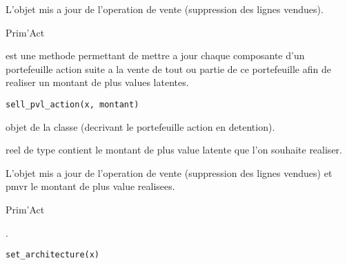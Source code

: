 \documentclass[a4paper]{book}
\begin{document}
%
\begin{Value}
L'objet  mis a jour de l'operation de vente (suppression des lignes vendues).
\end{Value}
%
\begin{Author}\relax
Prim'Act
\end{Author}
%
\begin{Description}\relax
{} est une methode permettant de mettre a jour chaque composante d'un portefeuille action suite a la vente
de tout ou partie de ce portefeuille afin de realiser un montant de plus values latentes.
\end{Description}
%
\begin{Usage}
\begin{verbatim}
sell_pvl_action(x, montant)
\end{verbatim}
\end{Usage}
%
\begin{Arguments}
\begin{ldescription}
\item[\code{x}] objet de la classe  (decrivant le portefeuille action en detention).

\item[\code{montant}] reel de type  contient le montant de plus value latente que l'on souhaite realiser.
\end{ldescription}
\end{Arguments}
%
\begin{Value}
L'objet  mis a jour de l'operation de vente (suppression des lignes vendues) et pmvr le montant de plus value realisees.
\end{Value}
%
\begin{Author}\relax
Prim'Act
\end{Author}
%
\begin{Description}\relax
{}.
\end{Description}
%
\begin{Usage}
\begin{verbatim}
set_architecture(x)
\end{verbatim}
\end{Usage}
\end{document}
